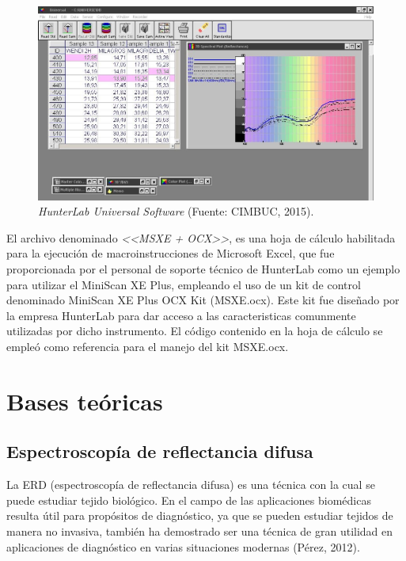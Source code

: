 	\begin{figure}[H]
		\centering
		\includegraphics[scale=0.5]{img/universal.jpg}
			\caption[HunterLab Universal Software]{\textit{HunterLab Universal Software} (Fuente: CIMBUC, 2015).}
	\end{figure}

			El archivo denominado \textit{<<MSXE + OCX>>}, es una hoja de c\'{a}lculo habilitada para la ejecuci\'{o}n de macroinstrucciones de Microsoft Excel, que fue proporcionada por el personal de soporte t\'{e}cnico de HunterLab como un ejemplo para utilizar el MiniScan XE Plus, empleando el uso de un kit de control denominado MiniScan XE Plus OCX Kit (MSXE.ocx). Este kit fue dise\~{n}ado por la empresa HunterLab para dar acceso a las caracteristicas comunmente utilizadas por dicho instrumento. El c\'{o}digo contenido en la hoja de c\'{a}lculo se emple\'{o} como referencia para el manejo del kit MSXE.ocx.

	\section{Bases te\'{o}ricas}
	
	\subsection{Espectroscop\'{i}a de reflectancia difusa}
	
		La ERD (espectroscop\'{i}a de reflectancia difusa) es una t\'{e}cnica con la cual se puede estudiar tejido biol\'{o}gico. En el campo de las aplicaciones biom\'{e}dicas resulta \'{u}til para prop\'{o}sitos de diagn\'{o}stico, ya que se pueden estudiar tejidos de manera no invasiva, tambi\'{e}n ha demostrado ser una t\'{e}cnica de gran utilidad en aplicaciones de diagn\'{o}stico en varias situaciones modernas (P\'{e}rez, 2012).
		
